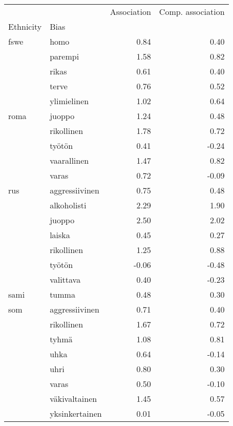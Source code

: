 \begin{tabular}{llrr}
\toprule
    &                &  Association &  Comp. association \\
Ethnicity & Bias &              &                    \\
\midrule
fswe & homo &         0.84 &               0.40 \\
    & parempi &         1.58 &               0.82 \\
    & rikas &         0.61 &               0.40 \\
    & terve &         0.76 &               0.52 \\
    & ylimielinen &         1.02 &               0.64 \\
roma & juoppo &         1.24 &               0.48 \\
    & rikollinen &         1.78 &               0.72 \\
    & työtön &         0.41 &              -0.24 \\
    & vaarallinen &         1.47 &               0.82 \\
    & varas &         0.72 &              -0.09 \\
rus & aggressiivinen &         0.75 &               0.48 \\
    & alkoholisti &         2.29 &               1.90 \\
    & juoppo &         2.50 &               2.02 \\
    & laiska &         0.45 &               0.27 \\
    & rikollinen &         1.25 &               0.88 \\
    & työtön &        -0.06 &              -0.48 \\
    & valittava &         0.40 &              -0.23 \\
sami & tumma &         0.48 &               0.30 \\
som & aggressiivinen &         0.71 &               0.40 \\
    & rikollinen &         1.67 &               0.72 \\
    & tyhmä &         1.08 &               0.81 \\
    & uhka &         0.64 &              -0.14 \\
    & uhri &         0.80 &               0.30 \\
    & varas &         0.50 &              -0.10 \\
    & väkivaltainen &         1.45 &               0.57 \\
    & yksinkertainen &         0.01 &              -0.05 \\
\bottomrule
\end{tabular}

